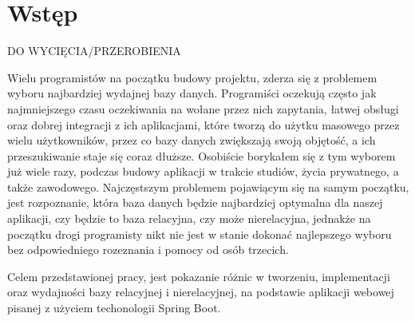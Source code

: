 \chapter*{Wstęp}


DO WYCIĘCIA/PRZEROBIENIA

Wielu programistów na początku budowy projektu, zderza się z problemem wyboru najbardziej wydajnej bazy danych. Programiści oczekują często jak najmniejszego czasu oczekiwania na wołane przez nich zapytania, łatwej obsługi oraz dobrej integracji z ich aplikacjami, które tworzą do użytku masowego przez wielu użytkowników, przez co bazy danych zwiększają swoją objętość, a  ich przeszukiwanie staje się coraz dłuższe. Osobiście borykałem się z tym wyborem już wiele razy, podczas budowy aplikacji w trakcie studiów, życia prywatnego, a także zawodowego. Najczęstszym problemem pojawiącym się na samym początku, jest rozpoznanie, która baza danych będzie najbardziej optymalna dla naszej aplikacji, czy będzie to baza relacyjna, czy może nierelacyjna, jednakże na początku drogi programisty nikt nie jest w stanie dokonać najlepszego wyboru bez odpowiedniego rozeznania i pomocy od osób trzecich.

Celem przedstawionej pracy, jest pokazanie różnic w tworzeniu, implementacji oraz wydajności bazy relacyjnej i nierelacyjnej, na podstawie aplikacji webowej pisanej z użyciem techonologii Spring Boot. 
